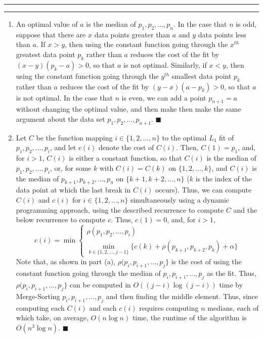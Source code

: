 \documentclass[11pt]{article}
\newcounter{questionCounter}
\newcounter{partCounter}[questionCounter]
\newenvironment{question}[2][\arabic{questionCounter}]{%
    \setcounter{partCounter}{0}%
    \vspace{.25in} \hrule \vspace{0.5em}%
        \noindent{\bf #2}%
    \vspace{0.8em} \hrule \vspace{.10in}%
    \addtocounter{questionCounter}{1}%
}{}
\begin{document}
\begin{question}{Fitting with $L_1$ Fidelity}
\begin{enumerate}
\item
An optimal value of $a$ is the median of $p_1,p_2,\ldots,p_n$. In the case
that $n$ is odd, suppose that there are $x$ data points greater than $a$ and
$y$ data points less than $a$. If $x > y$, then using the constant function
going through the $x^{th}$ greatest data point $p_k$ rather than $a$ reduces
the cost of the fit by $(x - y)(p_k - a) > 0$, so that $a$ is not optimal.
Similarly, if $x < y$, then using the constant function going through the
$y^{th}$ smallest data point $p_k$ rather than $a$ reduces the cost of the fit
by $(y - x)(a - p_k) > 0$, so that $a$ is not optimal.
In the case that $n$ is even, we can add a point $p_{n + 1} = a$ without
changing the optimal value, and then make then make the same argument about
the data set $p_1,p_2,\ldots,p_{n + 1}$. \qquad $\blacksquare$

\item Let $C$ be the function mapping $i \in \{1,2,\ldots,n\}$ to the optimal
$L_1$ fit of $p_1,p_2,\ldots,p_i$, and let $c(i)$ denote the cost of $C(i)$.
Then, $C(1) = p_1$, and, for $i > 1$, $C(i)$ is either a constant function, so
that $C(i)$ is the median of $p_1,p_2,\ldots,p_i$, or, for some $k$ with
$C(i) = C(k)$ on $\{1,2,\ldots,k\}$, and $C(i)$ is the median of
$p_{k + 1},p_{k + 2},\ldots,p_n$ on $\{k + 1,k + 2,\ldots, n\}$ ($k$ is the
index of the data point at which the last break in $C(i)$ occurs).
Thus, we can compute $C(i)$ and $c(i)$ for $i \in \{1,2,\ldots,n\}$
simultaneously using a dynamic programming approach, using the described
recurrence to compute $C$ and the below recurrence to compute $c$.
Thus, $c(1) = 0$, and, for $i > 1$,
\[
   c(i) = \min \left\{
     \begin{array}{l}
       \rho(p_1,p_2,\ldots,p_i) \\
       \min_{k \in \{1,2,\ldots,j - 1\}} \{c(k)
                                    + \rho(p_{k + 1},p_{k + 2},p_k) + \alpha\}
     \end{array}
   \right.
\]
Note that, as shown in part (a), $\rho(p_i,p_{i + 1},\ldots,p_j\}$ is the
cost of using the constant function going through the median of
$p_i,p_{i + 1},\ldots,p_j$ as the fit. Thus, $\rho(p_i,p_{i + 1},\ldots,p_j\}$
can be computed in $O((j - i) \log(j - i))$ time by Merge-Sorting
$p_i,p_{i + 1},\ldots,p_j$ and then finding the middle element. Thus, since
computing each $C(i)$ and each $c(i)$ requires computing $n$ medians, each of
which take, on average, $O(n\log n)$ time, the runtime of the algorithm is
$O(n^3\log n)$. \qquad $\blacksquare$


\end{enumerate}
\end{question}
\end{document}
